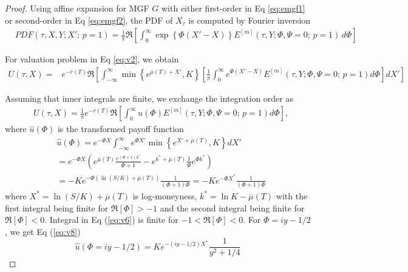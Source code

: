 \documentclass[11pt,a4paper] {article}
\begin{document}
\begin{proof}
Using affine expansion for MGF $G$  with either first-order in Eq \eqref{eq:emgf1} or second-order in Eq \eqref{eq:emgf2}, the PDF of $X_{\tau}$ is computed by Fourier inversion
\begin{equation}\label {eq:v3}
\begin{split}
& PDF(\tau,X,Y; X';\,p=1) = \frac{1}{\pi}\Re\left[ \int^{\infty}_{0}\exp \left\{ \Phi (X'-X) \right\} E^{[m]}(\tau,Y; \Phi,\Psi=0;\,p=1)\,d\Phi\right]
\end{split}
\end{equation}


For valuation problem in Eq \eqref{eq:v2}, we obtain
\begin{equation*}
\begin{split}
    U(\tau, X) = &e^{-\overline{r}(T)}\Re\left[ \int^{\infty}_{-\infty}\min\left\{e^{\overline{\mu}(T)+X'},K\right\} \left[\frac{1}{\pi} \int^{\infty}_{0}e^{\Phi (X'-X)} E^{[m]}(\tau,Y; \Phi,\Psi=0;\,p=1)d\Phi\right]dX'\right]
\end{split} 
\end{equation*}

Assuming that inner integrals are finite, we exchange the integration order as
\begin{equation} \label {eq:v5}
\begin{split}
  & U(\tau, X) = \frac{1}{\pi} e^{-\overline{r}(T)} \Re\left[\int^{\infty}_{0}\widehat{u}(\Phi)E^{[m]}(\tau,Y; \Phi,\Psi=0;\,p=1)d\Phi\right],
\end{split} 
\end{equation}
where $\widehat{u}(\Phi)$ is the transformed payoff function
\begin{equation} \label {eq:v6}
\begin{split}
&   \widehat{u}(\Phi)  =  e^{-\Phi X}\int^{\infty}_{-\infty}e^{\Phi X'} \min\left\{e^{ X'+\overline{\mu}(T)},K\right\}  dX'  \\
& =e^{-\Phi X} \left( e^{\overline{\mu}(T)}  \frac{e^{(\Phi+1) k^{*}}}{\Phi+1} - e^{k^{*}+\overline{\mu}(T)}\frac{1}{\Phi}e^{\Phi k^{*}}\right) \\
		& =-  Ke^{-\Phi\left(\ln (S/K)+ \overline{\mu}(T)\right)}\frac{1}{(\Phi+1)\Phi} = -K e^{-\Phi X^{*}} \frac{1}{(\Phi+1)\Phi}
\end{split} 
\end{equation}
where $X^{*}=\ln(S/K)+\overline{\mu}(T)$ is log-moneyness, $k^{*}=\ln K-\overline{\mu}(T)$ with the first integral being finite for $\Re[\Phi]>-1$ and the second integral being finite for $\Re[\Phi]<0$. Integral in Eq (\ref{eq:v6}) is finite for $-1<\Re[\Phi]<0$. For $\Phi=iy-1/2$, we get Eq (\ref{eq:v8})
\begin{equation}\label{eq:v7}
\widehat{u}(\Phi = iy-1/2) = 
K e^{-(iy-1/2) X^{*}}  \frac{1}{y^{2}+1/4}
\end{equation}
\end{proof}
\end{document}
